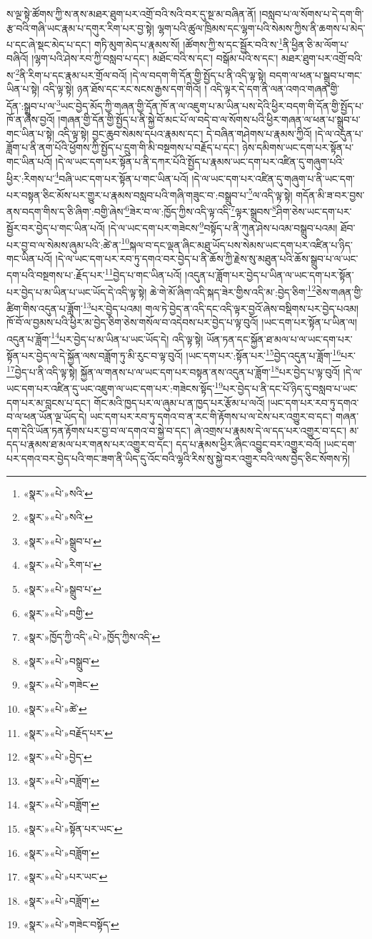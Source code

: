 ས་ལྔ་སྟེ་ཚོགས་ཀྱི་ས་ནས་མཐར་ཐུག་པར་འགྲོ་བའི་སའི་བར་དུ་སྔ་མ་བཞིན་ནོ། །བསླབ་པ་ལ་སོགས་པ་དེ་དག་གི་རྩ་བའི་གཞི་ཡང་རྣམ་པ་དགུར་རིག་པར་བྱ་སྟེ། ལྷག་པའི་ཚུལ་ཁྲིམས་དང་ལྷག་པའི་སེམས་ཀྱིས་ནི་ཆགས་པ་མེད་པ་དང་ཞེ་སྡང་མེད་པ་དང་། གཏི་མུག་མེད་པ་རྣམས་སོ། །ཚོགས་ཀྱི་ས་དང་སྦྱོར་བའི་ས་\footnote{«སྣར་»«པེ་»སའི་}ནི་ཕྱིན་ཅི་མ་ལོག་པ་བཞིའོ། །ལྷག་པའི་ཤེས་རབ་ཀྱི་བསླབ་པ་དང་། མཐོང་བའི་ས་དང་། བསྒོམ་པའི་ས་དང་། མཐར་ཐུག་པར་འགྲོ་བའི་ས་\footnote{«སྣར་»«པེ་»སའི་}ནི་རིག་པ་དང་རྣམ་པར་གྲོལ་བའོ། །དེ་ལ་བདག་གི་དོན་གྱི་སྤྱོད་པ་ནི་འདི་ལྟ་སྟེ། བདག་ལ་ཕན་པ་སྒྲུབ་པ་གང་ཡིན་པ་སྟེ། འདི་ལྟ་སྟེ། ཉན་ཐོས་དང་རང་སངས་རྒྱས་དག་གིའོ། །
འདི་ལྟར་དེ་དག་ནི་ལན་འགའ་གཞན་གྱི་དོན་:སྒྲུབ་པ་ལ་\footnote{«སྣར་»«པེ་»སྒྲུབ་པ་}ཡང་བྱེད་མོད་ཀྱི་གཞན་གྱི་དོན་ཁོ་ན་ལ་འཇུག་པ་མ་ཡིན་པས་དེའི་ཕྱིར་བདག་གི་དོན་གྱི་སྤྱོད་པ་ཁོ་ན་ཞེས་བྱའོ། །གཞན་གྱི་དོན་གྱི་སྤྱོད་པ་ནི་སྐྱེ་བོ་མང་པོ་ལ་བདེ་བ་ལ་སོགས་པའི་ཕྱིར་གཞན་ལ་ཕན་པ་སྒྲུབ་པ་གང་ཡིན་པ་སྟེ། འདི་ལྟ་སྟེ། བྱང་ཆུབ་སེམས་དཔའ་རྣམས་དང་། དེ་བཞིན་གཤེགས་པ་རྣམས་ཀྱིའོ། །དེ་ལ་འདུན་པ་ཟློག་པ་ནི་ནག་པོའི་ཕྱོགས་ཀྱི་སྤྱོད་པ་དྲུག་གི་མི་བསྔགས་པ་བརྗོད་པ་དང་། ཉེས་དམིགས་ཡང་དག་པར་སྟོན་པ་གང་ཡིན་པའོ། །དེ་ལ་ཡང་དག་པར་སྟོན་པ་ནི་དཀར་པོའི་སྤྱོད་པ་རྣམས་ཡང་དག་པར་འཛིན་དུ་གཞུག་པའི་ཕྱིར་:རིགས་པ་\footnote{«སྣར་»«པེ་»རིག་པ་}བཞི་ཡང་དག་པར་སྟོན་པ་གང་ཡིན་པའོ། །དེ་ལ་ཡང་དག་པར་འཛིན་དུ་གཞུག་པ་ནི་ཡང་དག་པར་བསྟན་ཅིང་མོས་པར་གྱུར་པ་རྣམས་བསླབ་པའི་གཞི་གཟུང་བ་:བསྒྲུབ་པ་\footnote{«སྣར་»«པེ་»སྒྲུབ་པ་}ལ་འདི་ལྟ་སྟེ། གདོན་མི་ཟ་བར་བྱས་ནས་བདག་གིས་ད་ཅི་ཞིག་:བགྱི་ཞེས་\footnote{«སྣར་»«པེ་»བགྱི་}ཟེར་བ་ལ་:ཁྱོད་ཀྱིས་འདི་ལྟ་འདི་\footnote{«སྣར་»ཁྱོད་ཀྱི་འདི་«པེ་»ཁྱོད་ཀྱིས་འདི་}ལྟར་སྒྲུབས་\footnote{«སྣར་»«པེ་»བསྒྲུབ་}ཤིག་ཅེས་ཡང་དག་པར་སྦྱོར་བར་བྱེད་པ་གང་ཡིན་པའོ། །དེ་ལ་ཡང་དག་པར་གཟེངས་\footnote{«སྣར་»«པེ་»གཟེང་}བསྟོད་པ་ནི་ཀུན་ཤེས་པའམ་བསྒྲུབ་པའམ། ཐོབ་པར་བྱ་བ་ལ་སེམས་ཞུམ་པའི་:ཚེ་ན་\footnote{«སྣར་»«པེ་»ཚེ་}སྐལ་བ་དང་ལྡན་ཞིང་མཐུ་ཡོད་པས་སེམས་ཡང་དག་པར་འཛིན་པ་ཉིད་གང་ཡིན་པའོ། །དེ་ལ་ཡང་དག་པར་རབ་ཏུ་དགའ་བར་བྱེད་པ་ནི་ཆོས་ཀྱི་རྗེས་སུ་མཐུན་པའི་ཆོས་སྒྲུབ་པ་ལ་ཡང་དག་པའི་བསྔགས་པ་:རྗོད་པར་\footnote{«སྣར་»«པེ་»བརྗོད་པར་}བྱེད་པ་གང་ཡིན་པའོ། །འདུན་པ་ཟློག་པར་བྱེད་པ་ཡིན་ལ་ཡང་དག་པར་སྟོན་པར་བྱེད་པ་མ་ཡིན་པ་ཡང་ཡོད་དེ་འདི་ལྟ་སྟེ། ཆེ་གེ་མོ་ཞིག་འདི་སྐད་ཟེར་གྱིས་འདི་མ་:བྱེད་ཅིག་\footnote{«སྣར་»«པེ་»བྱེད་}ཅེས་གཞན་གྱི་ཚིག་གིས་འདུན་པ་ཟློག་\footnote{«སྣར་»«པེ་»བཟློག་}པར་བྱེད་པའམ། གལ་ཏེ་བྱེད་ན་འདི་དང་འདི་ལྟར་བྱའོ་ཞེས་བསྡིགས་པར་བྱེད་པའམ། ཁོ་བོ་ལ་བྱམས་པའི་ཕྱིར་མ་བྱེད་ཅིག་ཅེས་གསོལ་བ་འདེབས་པར་བྱེད་པ་ལྟ་བུའོ། །ཡང་དག་པར་སྟོན་པ་ཡིན་ལ། འདུན་པ་ཟློག་\footnote{«སྣར་»«པེ་»བཟློག་}པར་བྱེད་པ་མ་ཡིན་པ་ཡང་ཡོད་དེ། འདི་ལྟ་སྟེ། ཡོན་ཏན་དང་སྐྱོན་ཐ་མལ་པ་ལ་ཡང་དག་པར་སྟོན་པར་བྱེད་ལ་དེ་སྐྱོན་ལས་བཟློག་ཏུ་མི་རུང་བ་ལྟ་བུའོ། །ཡང་དག་པར་:སྟོན་པར་\footnote{«སྣར་»«པེ་»སྟོན་པར་ཡང་}བྱེད་འདུན་པ་ཟློག་\footnote{«སྣར་»«པེ་»བཟློག་}པར་\footnote{«སྣར་»«པེ་»པར་ཡང་}བྱེད་པ་ནི་འདི་ལྟ་སྟེ། སྐྱོན་ལ་གནས་པ་ལ་ཡང་དག་པར་བསྟན་ནས་འདུན་པ་ཟློག་\footnote{«སྣར་»«པེ་»བཟློག་}པར་བྱེད་པ་ལྟ་བུའོ། །དེ་ལ་ཡང་དག་པར་འཛིན་དུ་ཡང་འཇུག་ལ་ཡང་དག་པར་:གཟེངས་སྟོད་\footnote{«སྣར་»«པེ་»གཟེང་བསྟོད་}པར་བྱེད་པ་ནི་དང་པོ་ཉིད་དུ་བསླབ་པ་ཡང་དག་པར་མ་བླངས་པ་དང་། གོང་མའི་ཁྱད་པར་ལ་ཞུམ་པ་ན་ཁྱད་པར་རྩོམ་པ་ལའོ། །ཡང་དག་པར་རབ་ཏུ་དགའ་བ་ལ་ཕན་ཡོན་ལྔ་ཡོད་དེ། ཡང་དག་པར་རབ་ཏུ་དགའ་བ་ན་རང་གི་རྟོགས་པ་ལ་ངེས་པར་འགྱུར་བ་དང་། གཞན་དག་དེའི་ཡོན་ཏན་རྟོགས་པར་བྱ་བ་ལ་དགའ་བ་སྐྱེ་བ་དང་། ཞེ་འགྲས་པ་རྣམས་དེ་ལ་དད་པར་འགྱུར་བ་དང་། མ་དད་པ་རྣམས་ཐ་མལ་པར་གནས་པར་འགྱུར་བ་དང་། དད་པ་རྣམས་ཕྱིར་ཞིང་འབྱུང་བར་འགྱུར་བའོ། །ཡང་དག་པར་དགའ་བར་བྱེད་པའི་གང་ཟག་ནི་ཡིད་དུ་འོང་བའི་ལྷའི་རིས་སུ་སྐྱེ་བར་འགྱུར་བའི་ལས་བྱེད་ཅིང་སོགས་ཏེ། 